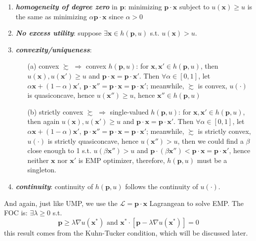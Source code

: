 \begin{enumerate}
    \item \textit{\textbf{homogeneity of degree zero}} in $\mathbf{p}$: minimizing $\mathbf{p}\cdot\mathbf{x}$ subject to $u(\mathbf{x})\geq u$ is the same as minimizing $\alpha \mathbf{p}\cdot\mathbf{x}$ since $\alpha >0$
    \item \textit{\textbf{No excess utility}}: suppose $\exists \mathbf{x}\in h(\mathbf{p},u)$ s.t. $u(\mathbf{x})>u$. 
    \item \textit{\textbf{convexity/uniqueness}}:
    \begin{enumerate}
        \item[(a)] convex $\succsim$ $\Rightarrow$ convex $ h(\mathbf{p},u)$: for $\mathbf{x},\mathbf{x}'\in h(\mathbf{p},u)$, then $u(\mathbf{x}),u(\mathbf{x}')\geq u$ and $\mathbf{p}\cdot\mathbf{x}=\mathbf{p}\cdot\mathbf{x}'$. Then $\forall \alpha\in[0,1]$, let $\alpha\mathbf{x}+(1-\alpha)\mathbf{x}'$, $\mathbf{p}\cdot\mathbf{x}''=\mathbf{p}\cdot\mathbf{x}=\mathbf{p}\cdot\mathbf{x}'$; meanwhile, $\succsim$ is convex, $u(\cdot)$ is quasiconcave, hence $u(\mathbf{x}'')\geq u$, hence $\mathbf{x}''\in h(\mathbf{p},u)$
        \item[(b)] strictly convex $\succsim$ $\Rightarrow$ single-valued $ h(\mathbf{p},u)$: for $\mathbf{x},\mathbf{x}'\in h(\mathbf{p},u)$, then again $u(\mathbf{x}),u(\mathbf{x}')\geq u$ and $\mathbf{p}\cdot\mathbf{x}=\mathbf{p}\cdot\mathbf{x}'$. Then $\forall \alpha\in[0,1]$, let $\alpha\mathbf{x}+(1-\alpha)\mathbf{x}'$, $\mathbf{p}\cdot\mathbf{x}''=\mathbf{p}\cdot\mathbf{x}=\mathbf{p}\cdot\mathbf{x}'$; meanwhile, $\succsim$ is strictly convex, $u(\cdot)$ is strictly quasiconcave, hence $u(\mathbf{x}'')> u$, then we could find a $\beta$ close enough to 1 s.t. $u(\beta\mathbf{x}'')>u$ and $\mathbf{p}\cdot(\beta \mathbf{x}'')<\mathbf{p}\cdot \mathbf{x}=\mathbf{p}\cdot \mathbf{x}'$, hence neither $\mathbf{x}$ nor $\mathbf{x}'$ is EMP optimizer, therefore, $h(\mathbf{p},u)$ must be a singleton.
    \end{enumerate}
    \item \textit\textbf{continuity}: continuity of $h(\mathbf{p},u)$ follows the continuity of $u(\cdot)$.
\end{enumerate}

And again, just like UMP, we use the $\mathcal{L}=\mathbf{p}\cdot\mathbf{x}$ Lagrangean to solve EMP. The FOC is: $\exists \lambda \geq 0$ s.t.
$$\mathbf{p}\geq \lambda\nabla u(\mathbf{x}^*)\text{ and }\mathbf{x}^*\cdot[\mathbf{p}-\lambda \nabla u(\mathbf{x}^*)]=0$$
this result comes from the Kuhn-Tucker condition, which will be discussed later.

